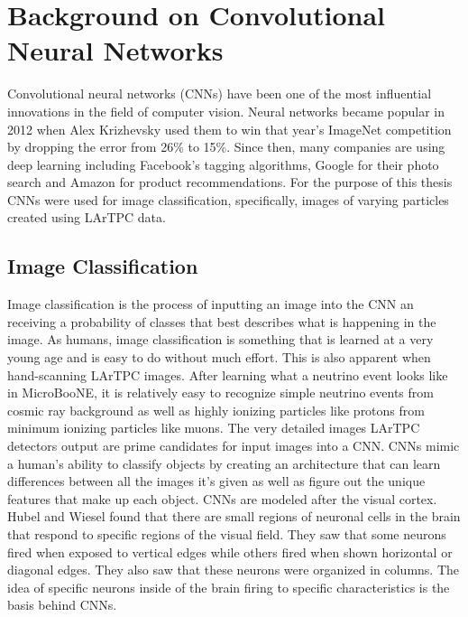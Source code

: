 \chapter{Background on Convolutional Neural Networks}\label{ch:cnn}
Convolutional neural networks (CNNs) have been one of the most influential innovations in the field of computer vision. Neural networks became popular in 2012 when Alex Krizhevsky used them to win that year's ImageNet competition\cite{aleximagenet} by dropping the error from 26\% to 15\%. Since then, many companies are using deep learning including Facebook's tagging algorithms, Google for their photo search and Amazon for product recommendations. For the purpose of this thesis CNNs were used for image classification, specifically, images of varying particles created using LArTPC data. 

\section{Image Classification} 
Image classification is the process of inputting an image into the CNN an receiving a probability of classes that best describes what is happening in the image. As humans, image classification is something that is learned at a very young age and is easy to do without much effort. This is also apparent when hand-scanning LArTPC images. After learning what a neutrino event looks like in MicroBooNE, it is relatively easy to recognize simple neutrino events from cosmic ray background as well as highly ionizing particles like protons from minimum ionizing particles like muons. The very detailed images LArTPC detectors output are prime candidates for input images into a CNN. CNNs mimic a human's ability to classify objects by creating an architecture that can learn differences between all the images it's given as well as figure out the unique features that make up each object. CNNs are modeled after the visual cortex. Hubel and Wiesel\cite{hubel} found that there are small regions of neuronal cells in the brain that respond to specific regions of the visual field. They saw that some neurons fired when exposed to vertical edges while others fired when shown horizontal or diagonal edges. They also saw that these neurons were organized in columns. The idea of specific neurons inside of the brain firing to specific characteristics is the basis behind CNNs.

